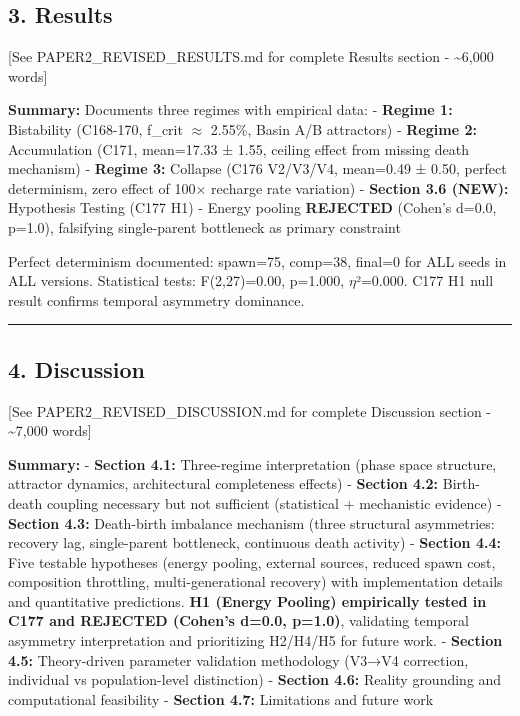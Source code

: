 \documentclass[
]{article}
\begin{document}
\subsection{3. Results}\label{results}

{[}See PAPER2\_REVISED\_RESULTS.md for complete Results section -
\textasciitilde6,000 words{]}

\textbf{Summary:} Documents three regimes with empirical data: -
\textbf{Regime 1:} Bistability (C168-170, f\_crit $\approx$ 2.55\%, Basin A/B
attractors) - \textbf{Regime 2:} Accumulation (C171, mean=17.33 ± 1.55,
ceiling effect from missing death mechanism) - \textbf{Regime 3:}
Collapse (C176 V2/V3/V4, mean=0.49 ± 0.50, perfect determinism, zero
effect of 100× recharge rate variation) - \textbf{Section 3.6 (NEW):}
Hypothesis Testing (C177 H1) - Energy pooling \textbf{REJECTED} (Cohen's
d=0.0, p=1.0), falsifying single-parent bottleneck as primary constraint

Perfect determinism documented: spawn=75, comp=38, final=0 for ALL seeds
in ALL versions. Statistical tests: F(2,27)=0.00, p=1.000, $\eta$²=0.000.
C177 H1 null result confirms temporal asymmetry dominance.

\begin{center}\rule{0.5\linewidth}{0.5pt}\end{center}

\subsection{4. Discussion}\label{discussion}

{[}See PAPER2\_REVISED\_DISCUSSION.md for complete Discussion section -
\textasciitilde7,000 words{]}

\textbf{Summary:} - \textbf{Section 4.1:} Three-regime interpretation
(phase space structure, attractor dynamics, architectural completeness
effects) - \textbf{Section 4.2:} Birth-death coupling necessary but not
sufficient (statistical + mechanistic evidence) - \textbf{Section 4.3:}
Death-birth imbalance mechanism (three structural asymmetries: recovery
lag, single-parent bottleneck, continuous death activity) -
\textbf{Section 4.4:} Five testable hypotheses (energy pooling, external
sources, reduced spawn cost, composition throttling, multi-generational
recovery) with implementation details and quantitative predictions.
\textbf{H1 (Energy Pooling) empirically tested in C177 and REJECTED
(Cohen's d=0.0, p=1.0)}, validating temporal asymmetry interpretation
and prioritizing H2/H4/H5 for future work. - \textbf{Section 4.5:}
Theory-driven parameter validation methodology (V3→V4 correction,
individual vs population-level distinction) - \textbf{Section 4.6:}
Reality grounding and computational feasibility - \textbf{Section 4.7:}
Limitations and future work
\end{document}
